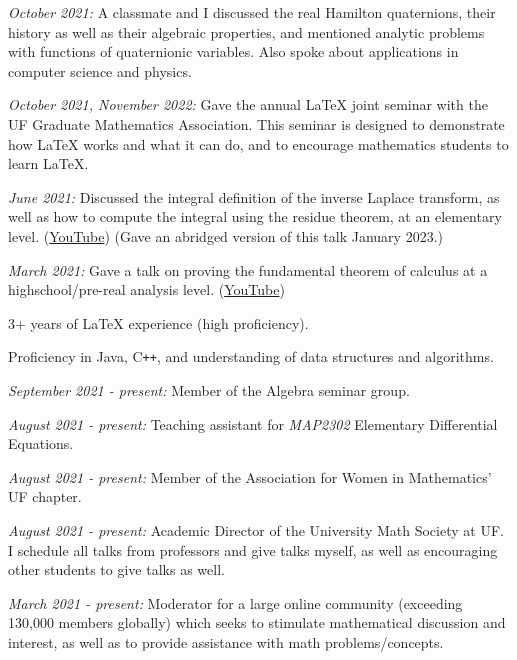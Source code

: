 \documentclass[11pt]{article}
\begin{document}
\textsl{October 2021:} A classmate and I discussed the real Hamilton quaternions, their history as well as their algebraic properties, and mentioned analytic problems with functions of quaternionic variables. Also spoke about applications in computer science and physics.

\textsl{October 2021, November 2022:} Gave the annual \LaTeX\hspace{1pt} joint seminar with the UF Graduate Mathematics Association. This seminar is designed to demonstrate how \LaTeX\hspace{1pt} works and what it can do, and to encourage mathematics students to learn \LaTeX\hspace{1pt}.

\textsl{June 2021:} Discussed the integral definition of the inverse Laplace transform, as well as how to compute the integral using the residue theorem, at an elementary level. ({\color{blue}\href{https://youtu.be/20Xbrit2chw}{YouTube}}) (Gave an abridged version of this talk January 2023.)

\textsl{March 2021:} Gave a talk on proving the fundamental theorem of calculus at a highschool/pre-real analysis level. ({\color{blue}\href{https://youtu.be/l4GO-n-2ETQ}{YouTube}})



3+ years of \LaTeX\hspace{1pt} experience (high proficiency).

Proficiency in Java, C\verb!++!, and understanding of data structures and algorithms. 



\textsl{September 2021 - present:} Member of the Algebra seminar group.

\textsl{August 2021 - present:} Teaching assistant for \textsl{MAP2302} Elementary Differential Equations.

\textsl{August 2021 - present:} Member of the Association for Women in Mathematics' UF chapter.

\textsl{August 2021 - present:} Academic Director of the University Math Society at UF. I schedule all talks from professors and give talks myself, as well as encouraging other students to give talks as well.

\textsl{March 2021 - present:} Moderator for a large online community (exceeding 130,000 members globally) which seeks to stimulate mathematical discussion and interest, as well as to provide assistance with math problems/concepts.
\end{document}
